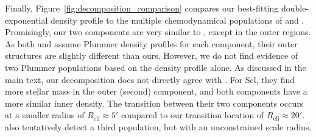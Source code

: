 \documentclass[times,trackchanges, twocolumn, twocolappendix]{aastex701}
\makeatletter
\DeclareRobustCommand\citepos
  {\begingroup
   \let\NAT@nmfmt\NAT@posfmt%
   \NAT@swafalse\let\NAT@ctype\z@\NAT@partrue
   \@ifstar{\NAT@fulltrue\NAT@citetp}{\NAT@fullfalse\NAT@citetp}}
\let\NAT@orig@nmfmt\NAT@nmfmt
\def\NAT@posfmt#1{\NAT@orig@nmfmt{#1's}}
\makeatother
\begin{document}
Finally, Figure~\ref{fig:decomposition_comparison} compares our best-fitting double-exponential density profile to the multiple chemodynamical populations of \citet{arroyo-polonio+2024} and \citet{pace+2020}. Promisingly, our two components are very similar to \citet{pace+2020}, except in the outer regions. As both \citet{arroyo-polonio+2024} and \citet{pace+2020} assume Plummer density profiles for each component, their outer structures are slightly different than ours. However, we do not find evidence of two Plummer populations based on the density profile alone.
As discussed in the main text, our decomposition does not directly agree with \citepos{arroyo-polonio+2024}. For Scl, they find more stellar mass in the outer (second) component, and both components have a more similar inner density. The transition between their two components occurs at a smaller radius of $R_\text{ell} \approx 5'$  compared to our transition location of $R_\text{ell} \approx 20'$. \citet{arroyo-polonio+2024} also tentatively detect a third population, but with an unconstrained scale radius.
\end{document}
